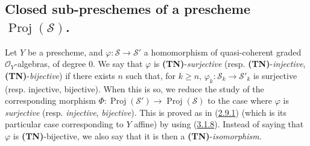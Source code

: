 \subsection{Closed sub-preschemes of a prescheme
$\operatorname{Proj}(\mathcal{S})$.}
\label{subsection:II.3.6}

\begin{env}[3.6.1]
\label{II.3.6.1}
Let $Y$ be a prescheme, and
$\varphi:\mathcal{S}\to\mathcal{S}'$ a homomorphism of quasi-coherent graded
$\mathcal{O}_Y$-algebras, of degree $0$. We say that
$\varphi$ is \textbf{(TN)}-\emph{surjective} (resp.
\textbf{(TN)}-\emph{injective}, \textbf{(TN)}-\emph{bijective}) if there exists $n$
such that, for $k\geq n$, $\varphi_k:\mathcal{S}_k\to\mathcal{S}'_k$ is
surjective (resp. injective, bijective). When this is so, we reduce the study
of the corresponding morphism
$\Phi:\operatorname{Proj}(\mathcal{S}')\to\operatorname{Proj}(\mathcal{S})$
to the case where $\varphi$ is \emph{surjective} (resp. \emph{injective}, \emph{bijective}).
This is proved as in (\hyperref[II.2.9.1]{2.9.1}) (which is its
particular case corresponding to $Y$ affine) by using
(\hyperref[II.3.1.8]{3.1.8}). Instead of saying that $\varphi$ is
\textbf{(TN)}-bijective, we also say that it is then a
\textbf{(TN)}-\emph{isomorphism}.
\end{env}

